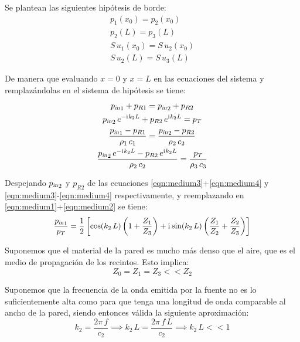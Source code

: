 \documentclass[a5paper,12pt,twoside]{book}
\begin{document}
Se plantean las siguientes hipótesis de borde:
\begin{gather*}
    p_1(x_0) = p_2(x_0)
    \\
    p_2(L) = p_3(L)
    \\
    S \, u_1(x_0) = S \, u_2(x_0)
    \\
    S \, u_2(L) = S \, u_3(L)
\end{gather*}

De manera que evaluando $x=0$ y $x=L$ en las ecuaciones del sistema y remplazándolas en el sistema de hipótesis se tiene:
\begin{gather}
    {{p}_\textsl{{in}}}_1 + p_{R1} = {{p}_\textsl{{in}}}_2 + p_{R2}
    \label{eqn:medium1}
    \\
    {{p}_\textsl{{in}}}_2 \, e^{-\mathrm{i}\mkern1mu k_2 L} + p_{R2} \, e^{\mathrm{i}\mkern1mu k_2 L} = p_T
    \label{eqn:medium2}
    \\
    \frac{{{p}_\textsl{{in}}}_1 - p_{R1}}{\rho_1 \, c_1} = \frac{{{p}_\textsl{{in}}}_2 - p_{R2}}{\rho_2 \, c_2}
    \label{eqn:medium3}
    \\
    \frac{{{p}_\textsl{{in}}}_2 \, e^{-\mathrm{i}\mkern1mu k_2 L} - p_{R2} \, e^{\mathrm{i}\mkern1mu k_2 L}}{\rho_2 \, c_2} = \frac{p_T}{\rho_3 \, c_3}
    \label{eqn:medium4}
\end{gather}

Despejando ${{p}_\textsl{{in}}}_2$ y $p_{R2}$ de las ecuaciones \ref{eqn:medium3}+\ref{eqn:medium4} y \ref{eqn:medium3}-\ref{eqn:medium4} respectivamente, y reemplazando en \ref{eqn:medium1}+\ref{eqn:medium2} se tiene:
\begin{equation}
    \scale{0.96}
    {
    \frac{\sub{p}{in}_1}{p_T} = \frac{1}{2} \left[ \cos(k_2 \, L) \left( 1+\frac{Z_1}{Z_3} \right) + \iu \sin(k_2 \, L) \left( \frac{Z_1}{Z_2} + \frac{Z_2}{Z_3} \right) \right]
    }
    \label{eqn:mediumPin/PT}
\end{equation}

Suponemos que el material de la pared es mucho más denso que el aire, que es el medio de propagación de los recintos. Esto implica:
\begin{equation*}
    Z_0 = Z_1 = Z_3 << Z_2
\end{equation*}

Suponemos que la frecuencia de la onda emitida por la fuente no es lo suficientemente alta como para que tenga una longitud de onda comparable al ancho de la pared, siendo entonces válida la siguiente aproximación:
\begin{equation*}
    k_2 = \frac{2\pi \, f}{c_2}
    \implies k_2 \, L = \frac{2\pi \, f \, L}{c_2}
    \implies k_2 \, L << 1
\end{equation*}
\end{document}
